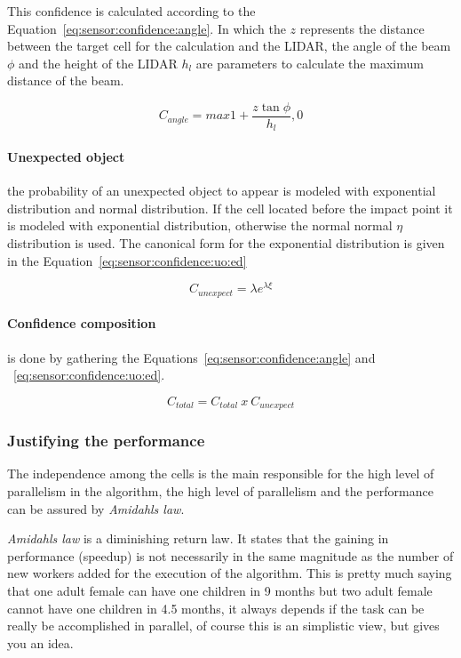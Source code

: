 This confidence is calculated according to the Equation~\ref{eq:sensor:confidence:angle}. In which the $z$ represents the distance between the target cell for the calculation and the LIDAR, the angle of the beam $\phi$ and the height of the LIDAR $h_l$ are parameters to calculate the maximum distance of the beam. 

\begin{equation}
\label{eq:sensor:confidence:angle}
C_{angle}=max{1+\frac{z\tan{\phi}}{h_l},0}
\end{equation}

\paragraph*{Unexpected object} the probability of an unexpected object to appear is modeled with exponential distribution and normal distribution. If the cell located before the impact point it is modeled with exponential distribution, otherwise the normal normal $\eta$ distribution is used. The canonical form for the exponential distribution is given in the Equation~\ref{eq:sensor:confidence:uo:ed}

\begin{equation}
\label{eq:sensor:confidence:uo:ed}
C_{unexpect}=\lambda e^{\lambda \xi}
\end{equation}

\paragraph*{Confidence composition} is done by gathering the Equations~\ref{eq:sensor:confidence:angle} and ~\ref{eq:sensor:confidence:uo:ed}.

\begin{equation}
C_{total}=C_{total}\ x\ C_{unexpect}
\end{equation}

\subsubsection{Justifying the performance}

The independence among the cells is the main responsible for the high level of parallelism in the algorithm, the high level of parallelism and the performance can be assured by \textit{Amidahls law}.

\textit{Amidahls law} is a diminishing return law. It states that the gaining in performance (speedup) is not necessarily in the same magnitude as the number of new workers added for the execution of the algorithm\cite{Amdahl:1967:VSP:1465482.1465560}. This is pretty much saying that one adult female can have one children in 9 months but two adult female cannot have one children in 4.5 months, it always depends if the task can be really be accomplished in parallel, of course this is an simplistic view, but gives you an idea.

